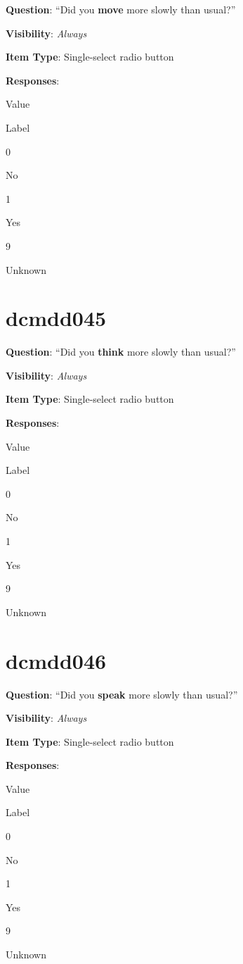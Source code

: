 \documentclass[
]{book}
\begin{document}
\textbf{Question}: ``Did you \textbf{move} more slowly than usual?''

\textbf{Visibility}: \emph{Always}

\textbf{Item Type}: Single-select radio button

\textbf{Responses}:

Value

Label

0

No

1

Yes

9

Unknown

\hypertarget{dcmdd045}{%
\section{dcmdd045}\label{dcmdd045}}

\textbf{Question}: ``Did you \textbf{think} more slowly than usual?''

\textbf{Visibility}: \emph{Always}

\textbf{Item Type}: Single-select radio button

\textbf{Responses}:

Value

Label

0

No

1

Yes

9

Unknown

\hypertarget{dcmdd046}{%
\section{dcmdd046}\label{dcmdd046}}

\textbf{Question}: ``Did you \textbf{speak} more slowly than usual?''

\textbf{Visibility}: \emph{Always}

\textbf{Item Type}: Single-select radio button

\textbf{Responses}:

Value

Label

0

No

1

Yes

9

Unknown
\end{document}
